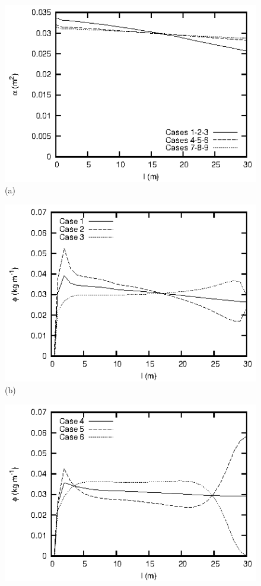 \documentclass[review,authoryear]{elsarticle}
\begin{document}
\begin{figure}[ht!]
\centering
\begin{minipage}{0.49\textwidth}
\centering
\includegraphics{water1-9.eps}
(a)
\end{minipage}
\begin{minipage}{0.49\textwidth}
\centering
\includegraphics{fertilizer123.eps}
(b)
\end{minipage}
\begin{minipage}{0.49\textwidth}
\centering
\includegraphics{fertilizer456.eps}

\end{minipage}
\end{figure}
\end{document}
